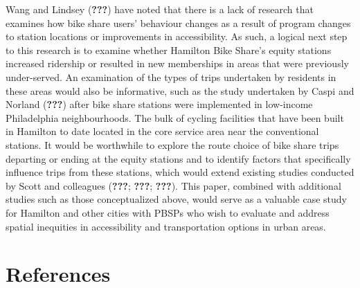 \documentclass[]{elsarticle} %
\begin{document}
Wang and Lindsey ({\textbf{???}}) have noted that there is a lack of
research that examines how bike share users' behaviour changes as a
result of program changes to station locations or improvements in
accessibility. As such, a logical next step to this research is to
examine whether Hamilton Bike Share's equity stations increased
ridership or resulted in new memberships in areas that were previously
under-served. An examination of the types of trips undertaken by
residents in these areas would also be informative, such as the study
undertaken by Caspi and Norland ({\textbf{???}}) after bike share
stations were implemented in low-income Philadelphia neighbourhoods. The
bulk of cycling facilities that have been built in Hamilton to date
located in the core service area near the conventional stations. It
would be worthwhile to explore the route choice of bike share trips
departing or ending at the equity stations and to identify factors that
specifically influence trips from these stations, which would extend
existing studies conducted by Scott and colleagues ({\textbf{???}};
{\textbf{???}}; {\textbf{???}}). This paper, combined with additional
studies such as those conceptualized above, would serve as a valuable
case study for Hamilton and other cities with PBSPs who wish to evaluate
and address spatial inequities in accessibility and transportation
options in urban areas.

\hypertarget{references}{%
\section*{References}\label{references}}
\end{document}

